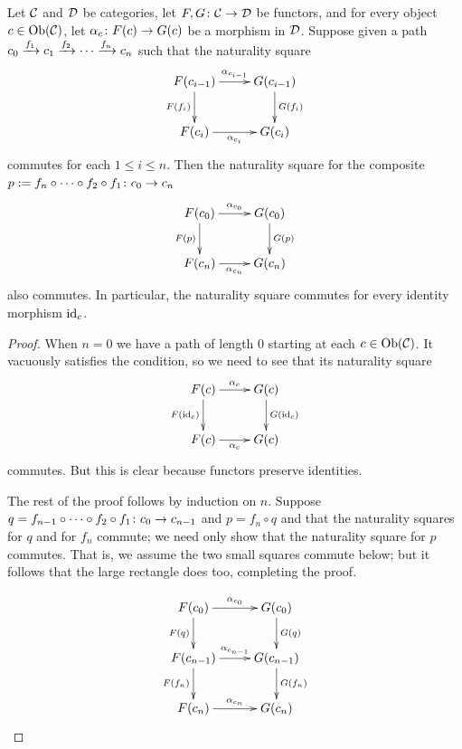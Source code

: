 \documentclass[CT4S-EN-RU]{subfiles}
\begin{document}
\begin{lemma}\label{lemma:generators for nattrans}

Let $\mathcal{C}$ and $\mathcal{D}$ be categories, let $F,G\colon\mathcal{C}\rightarrow\mathcal{D}$ be functors, and for every object $c\in\textnormal{Ob}(\mathcal{C})$, let $\alpha_c\colon F(c)\rightarrow G(c)$ be a morphism in $\mathcal{D}$. Suppose given a path $c_0\xrightarrow{f_1}c_1\xrightarrow{f_2}\cdots\xrightarrow{f_n} c_n$ such that the naturality square 
$$
\xymatrix{F(c_{i-1})\ar[d]_{F(f_i)}\ar[r]^{\alpha_{c_{i-1}}}&G(c_{i-1})\ar[d]^{G(f_i)}\\F(c_i)\ar[r]_{\alpha_{c_i}}&G(c_i)
}
$$
commutes for each $1\leq i\leq n$. Then the naturality square for the composite $p:=f_n\circ\cdots\circ f_2\circ f_1\colon c_0\rightarrow c_n$ 
$$\xymatrix{F(c_0)\ar[r]^{\alpha_{c_0}}\ar[d]_{F(p)}&G(c_0)\ar[d]^{G(p)}\\F(c_n)\ar[r]_{\alpha_{c_n}}&G(c_n)}
$$
also commutes. In particular, the naturality square commutes for every identity morphism $\textnormal{id}_c$.

\end{lemma}

\begin{proof}

When $n=0$ we have a path of length 0 starting at each $c\in\textnormal{Ob}(\mathcal{C})$. It vacuously satisfies the condition, so we need to see that its naturality square 
$$\xymatrix{F(c)\ar[r]^{\alpha_c}\ar[d]_{F(\id_c)}&G(c)\ar[d]^{G(\id_c)}\\F(c)\ar[r]_{\alpha_c}&G(c)}
$$
commutes. But this is clear because functors preserve identities. 

The rest of the proof follows by induction on $n$. Suppose $q=f_{n-1}\circ\cdots\circ f_2\circ f_1\colon c_0\rightarrow c_{n-1}$ and $p=f_n\circ q$ and that the naturality squares for $q$ and for $f_n$ commute; we need only show that the naturality square for $p$ commutes. That is, we assume the two small squares commute below; but it follows that the large rectangle does too, completing the proof.

$$
\xymatrix{
F(c_0)\ar[r]^{\alpha_{c_0}}\ar[d]_{F(q)}&G(c_0)\ar[d]^{G(q)}\\
F(c_{n-1})\ar[r]^{\alpha_{c_{n-1}}}\ar[d]_{F(f_n)}&G(c_{n-1})\ar[d]^{G(f_n)}\\
F(c_n)\ar[r]^{\alpha_{c_n}}&G(c_n)
}
$$

\end{proof}
\end{document}
